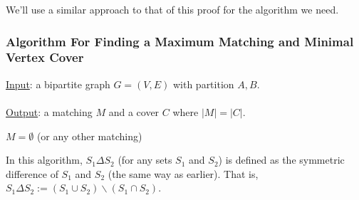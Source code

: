 \documentclass[]{article}
\theoremstyle{definition}
\begin{document}
			We'll use a similar approach to that of this proof for the algorithm we need.
			
			\subsubsection{Algorithm For Finding a Maximum Matching and Minimal Vertex Cover}
				\underline{Input}: a bipartite graph $G = (V, E)$ with partition $A, B$.
				\\ \\
				\underline{Output}: a matching $M$ and a cover $C$ where $|M| = |C|$. \\
				
				\begin{algorithm}[H]
					$M = \emptyset$ (or any other matching)\;
				\end{algorithm}
				
				In this algorithm, $S_1 \Delta S_2$ (for any sets $S_1$ and $S_2$) is defined as the symmetric difference of $S_1$ and $S_2$ (the same way as earlier). That is, $S_1 \Delta S_2 := (S_1 \cup S_2) \backslash (S_1 \cap S_2)$. 
			
\end{document}
